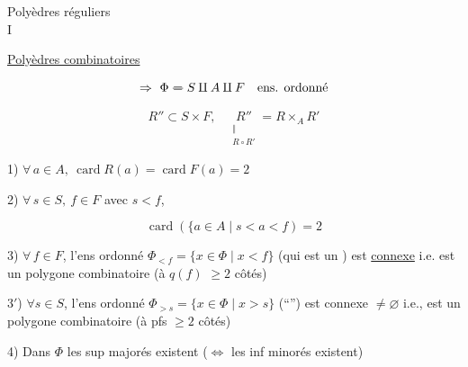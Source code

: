 
\begin{flushright}
Polyèdres réguliers\\
I
\end{flushright}



\uline{Polyèdres combinatoires}



\[
\Rightarrow\ \Phi\ \deleted{=}\ S\amalg A\amalg F
\quad\text{ens. ordonné}
\]

\[
 R''\subset S\times F,\quad
 \underset{\substack{\Vert\\R\circ R'}}{R''}=R\times_A R'
\]


1) $\forall\,a\in A,\ \operatorname{card}R(a)=\operatorname{card}F(a)=2$

2) $\forall\,s\in S,\ f\in F$ avec $s<f$,

\[
 \operatorname{card}(\{a\in A\mid s<a<f)=2
\]

3) $\forall\, f\in F$, l'ens ordonné $\Phi_{<f}=\{x\in\Phi\mid x<f\}$ (qui est un ) est \uline{connexe} \inserted{$\ne\varnothing$} i.e. est un polygone combinatoire (à $q(f)$ $\geq 2$ côtés)

3$'$) $\forall s\in S$, l'ens ordonné $\Phi_{>s}=\{x\in\Phi\mid x>s\}$ (``\quad '') est connexe $\ne\varnothing$ i.e., est un polygone combinatoire (à pfs $\geq 2$ côtés)


4) Dans $\Phi$ les sup majorés existent ($\Longleftrightarrow$ les inf minorés existent)

